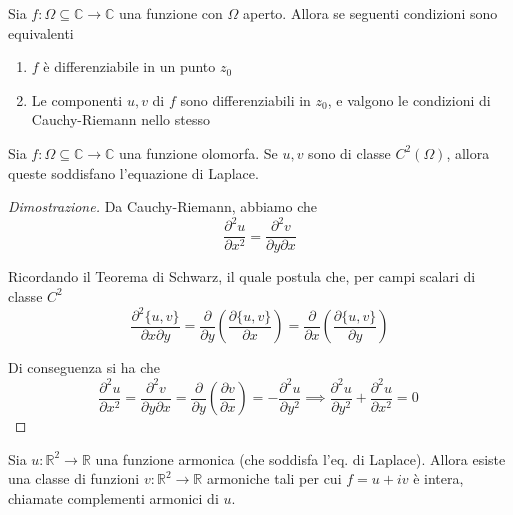             \begin{theorem}
                Sia $f: \Omega \subseteq \mathbb{C} \rightarrow \mathbb{C}$ una funzione con $\Omega$ aperto.
                Allora se seguenti condizioni sono equivalenti
                \begin{enumerate}
                    \item $f$ è differenziabile in un punto $z_{0}$
                    \item Le componenti $u, v$ di $f$ sono differenziabili in $z_{0}$, e valgono le condizioni di Cauchy-Riemann nello stesso
                \end{enumerate}
            \end{theorem}

            \begin{proposition}
                Sia $f: \Omega \subseteq \mathbb{C} \rightarrow \mathbb{C}$ una funzione olomorfa.
                Se $u, v$ sono di classe $C^{2}(\Omega)$, allora queste soddisfano l'equazione di Laplace.
            \end{proposition}

            \begin{proof}[Dimostrazione]
                Da Cauchy-Riemann, abbiamo che
                \[
                    \frac{\partial^{2} u}{\partial x^{2}} = \frac{\partial^{2} v}{\partial y \partial x}
                \]

                Ricordando il Teorema di Schwarz, il quale postula che, per campi scalari di classe $C^{2}$
                \[
                    \frac{\partial^{2} \{u, v\}}{\partial x \partial y} = \frac{\partial}{\partial y} \left(\frac{\partial \{u, v\}}{\partial x}\right) = \frac{\partial}{\partial x} \left(\frac{\partial \{u, v\}}{\partial y}\right)
                \]

                Di conseguenza si ha che
                \[
                    \frac{\partial^{2} u}{\partial x^{2}} = \frac{\partial^{2} v}{\partial y \partial x} = \frac{\partial}{\partial y} \left(\frac{\partial v}{\partial x}\right) = -\frac{\partial^{2} u}{\partial y^{2}} \implies \frac{\partial^{2} u}{\partial y^{2}} + \frac{\partial^{2} u}{\partial x^{2}} = 0 \
                \]
            \end{proof}

            \begin{proposition}
                Sia $u: \mathbb{R}^{2} \rightarrow \mathbb{R}$ una funzione armonica (che soddisfa l'eq. di Laplace).
                Allora esiste una classe di funzioni $v: \mathbb{R}^{2} \rightarrow \mathbb{R}$ armoniche tali per cui $f = u + i v$ è intera, chiamate complementi armonici di $u$.
            \end{proposition}



